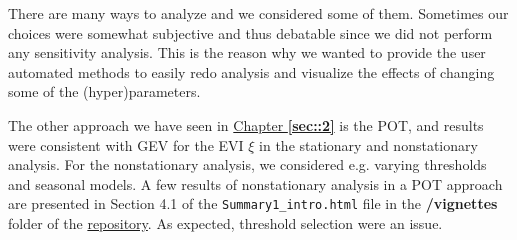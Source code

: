 There are many ways to analyze and we considered some of them. Sometimes our choices were somewhat subjective and thus debatable since we did not perform any sensitivity analysis. This is the reason why we wanted to provide the user automated methods to easily redo analysis and visualize the effects of changing some of the (hyper)parameters.

The other approach we have seen in \hyperref[sec::2]{Chapter \textbf{\ref{sec::2}}} is the POT, and results were consistent with GEV for the EVI $\xi$ in the stationary and nonstationary analysis. For the nonstationary analysis, we considered e.g. varying thresholds and seasonal models.
A few results of nonstationary analysis in a POT approach are presented in Section 4.1 of the \texttt{Summary1\_intro.html} file in the \textbf{/vignettes} folder of the \href{https://github.com/proto4426/PissoortThesis/}{repository}. As expected, threshold selection were an issue.


